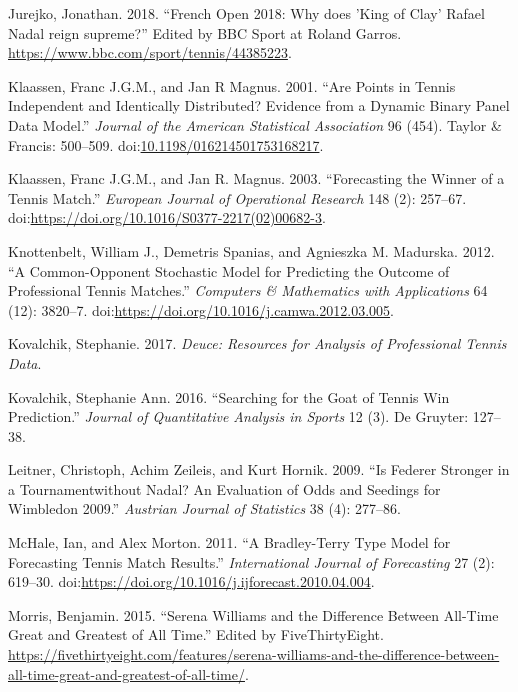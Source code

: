 \documentclass[]{article}
\begin{document}
\hypertarget{ref-bbc2018}{}
Jurejko, Jonathan. 2018. ``French Open 2018: Why does 'King of Clay'
Rafael Nadal reign supreme?'' Edited by BBC Sport at Roland Garros.
\url{https://www.bbc.com/sport/tennis/44385223}.

\hypertarget{ref-klaassen2001}{}
Klaassen, Franc J.G.M., and Jan R Magnus. 2001. ``Are Points in Tennis
Independent and Identically Distributed? Evidence from a Dynamic Binary
Panel Data Model.'' \emph{Journal of the American Statistical
Association} 96 (454). Taylor \& Francis: 500--509.
doi:\href{https://doi.org/10.1198/016214501753168217}{10.1198/016214501753168217}.

\hypertarget{ref-klaassen2003}{}
Klaassen, Franc J.G.M., and Jan R. Magnus. 2003. ``Forecasting the
Winner of a Tennis Match.'' \emph{European Journal of Operational
Research} 148 (2): 257--67.
doi:\href{https://doi.org/https://doi.org/10.1016/S0377-2217(02)00682-3}{https://doi.org/10.1016/S0377-2217(02)00682-3}.

\hypertarget{ref-knottenbelt2012}{}
Knottenbelt, William J., Demetris Spanias, and Agnieszka M. Madurska.
2012. ``A Common-Opponent Stochastic Model for Predicting the Outcome of
Professional Tennis Matches.'' \emph{Computers \& Mathematics with
Applications} 64 (12): 3820--7.
doi:\href{https://doi.org/https://doi.org/10.1016/j.camwa.2012.03.005}{https://doi.org/10.1016/j.camwa.2012.03.005}.

\hypertarget{ref-deuce2017}{}
Kovalchik, Stephanie. 2017. \emph{Deuce: Resources for Analysis of
Professional Tennis Data}.

\hypertarget{ref-kovalchik2016}{}
Kovalchik, Stephanie Ann. 2016. ``Searching for the Goat of Tennis Win
Prediction.'' \emph{Journal of Quantitative Analysis in Sports} 12 (3).
De Gruyter: 127--38.

\hypertarget{ref-leitner2009}{}
Leitner, Christoph, Achim Zeileis, and Kurt Hornik. 2009. ``Is Federer
Stronger in a Tournamentwithout Nadal? An Evaluation of Odds and
Seedings for Wimbledon 2009.'' \emph{Austrian Journal of Statistics} 38
(4): 277--86.

\hypertarget{ref-mchale2011}{}
McHale, Ian, and Alex Morton. 2011. ``A Bradley-Terry Type Model for
Forecasting Tennis Match Results.'' \emph{International Journal of
Forecasting} 27 (2): 619--30.
doi:\href{https://doi.org/https://doi.org/10.1016/j.ijforecast.2010.04.004}{https://doi.org/10.1016/j.ijforecast.2010.04.004}.

\hypertarget{ref-five2015}{}
Morris, Benjamin. 2015. ``Serena Williams and the Difference Between
All-Time Great and Greatest of All Time.'' Edited by FiveThirtyEight.
\url{https://fivethirtyeight.com/features/serena-williams-and-the-difference-between-all-time-great-and-greatest-of-all-time/}.
\end{document}
